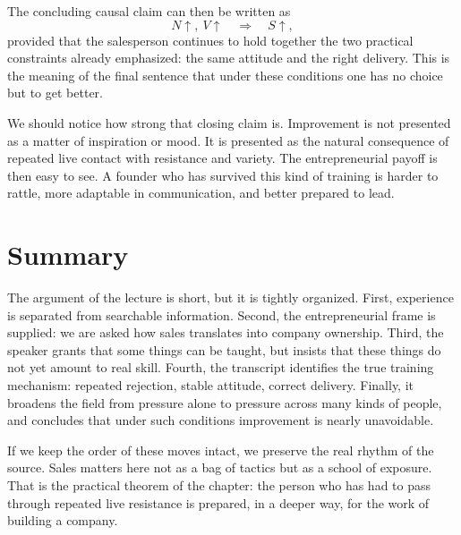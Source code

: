 The concluding causal claim can then be written as
\begin{equation}
N \uparrow,\ V \uparrow \quad \Longrightarrow \quad S \uparrow,
\end{equation}
provided that the salesperson continues to hold together the two practical constraints already emphasized: the same attitude and the right delivery. This is the meaning of the final sentence that under these conditions one has no choice but to get better.

We should notice how strong that closing claim is. Improvement is not presented as a matter of inspiration or mood. It is presented as the natural consequence of repeated live contact with resistance and variety. The entrepreneurial payoff is then easy to see. A founder who has survived this kind of training is harder to rattle, more adaptable in communication, and better prepared to lead.

\section{Summary}

The argument of the lecture is short, but it is tightly organized. First, experience is separated from searchable information. Second, the entrepreneurial frame is supplied: we are asked how sales translates into company ownership. Third, the speaker grants that some things can be taught, but insists that these things do not yet amount to real skill. Fourth, the transcript identifies the true training mechanism: repeated rejection, stable attitude, correct delivery. Finally, it broadens the field from pressure alone to pressure across many kinds of people, and concludes that under such conditions improvement is nearly unavoidable.

If we keep the order of these moves intact, we preserve the real rhythm of the source. Sales matters here not as a bag of tactics but as a school of exposure. That is the practical theorem of the chapter: the person who has had to pass through repeated live resistance is prepared, in a deeper way, for the work of building a company.